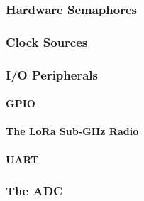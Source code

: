 \subsubsection{Hardware Semaphores}

\subsubsection{Clock Sources}

\subsubsection{I/O Peripherals}
\paragraph{GPIO}
\paragraph{The LoRa Sub-GHz Radio}
\paragraph{\iic}
\paragraph{UART}

\subsubsection{The ADC}
